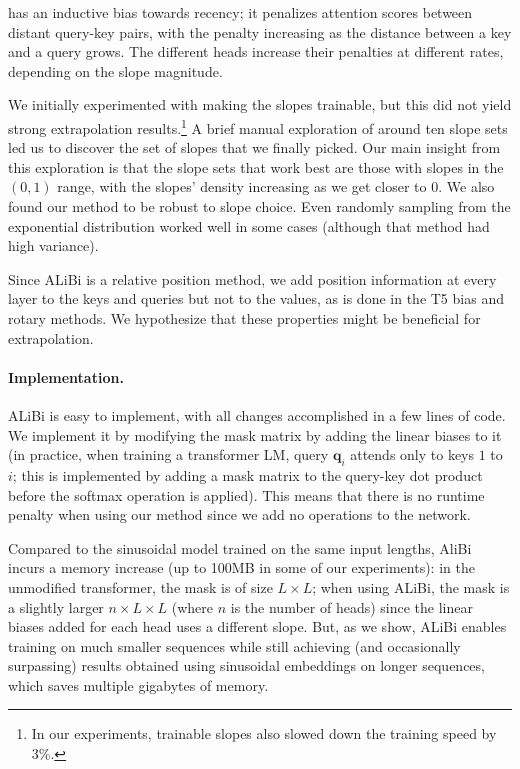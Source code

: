 \al has an inductive bias towards recency; it penalizes attention scores between distant query-key pairs, with the penalty increasing as the distance between a key and a query grows. The different heads increase their penalties at different rates, depending on the slope magnitude. 

We initially experimented with making the slopes trainable, but this did not yield strong extrapolation results.\footnote{In our experiments, trainable slopes also slowed down the training speed by 3\%.} %
A brief manual exploration of around ten slope sets led us to discover the set of slopes that we finally picked. Our main insight from this exploration is that the slope sets that work best are those with slopes in the $(0,1)$ range, with the slopes' density increasing as we get closer to $0$. 
We also found our method to be robust to slope choice. Even randomly sampling from the exponential distribution worked well in some cases (although that method had high variance). %

Since ALiBi is a relative position method, we add position information at every layer to the keys and queries but not to the values, as is done in the T5 bias and rotary methods. We hypothesize that these properties might be beneficial for extrapolation. %

\paragraph{Implementation.}
ALiBi is easy to implement, with all changes accomplished in a few lines of code. We implement it by modifying the mask matrix by adding the linear biases to it (in practice, when training a transformer LM, query $\mathbf{q}_i$ attends only to keys $1$ to $i$; this is implemented by adding a mask matrix to the query-key dot product before the softmax operation is applied). This means that there is no runtime penalty when using our method since we add no operations to the network.%

Compared to the sinusoidal model trained on the same input lengths, AliBi incurs a memory increase (up to 100MB in some of our experiments): in the unmodified transformer, the mask is of size $L\times L$; when using ALiBi, the mask is a slightly larger $n \times L\times L$ (where $n$ is the number of heads) since the linear biases added for each head uses a different slope. But, as we show, ALiBi enables training on much smaller sequences while still achieving (and occasionally surpassing) results obtained using sinusoidal embeddings on longer sequences, which saves multiple gigabytes of memory. 

